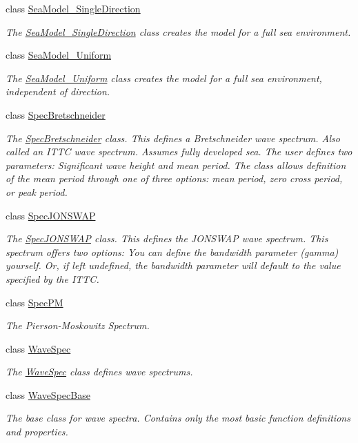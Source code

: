 \begin{DoxyCompactItemize}
class \hyperlink{classosea_1_1_sea_model___single_direction}{Sea\-Model\-\_\-\-Single\-Direction}
\begin{DoxyCompactList}\small\item\em The \hyperlink{classosea_1_1_sea_model___single_direction}{Sea\-Model\-\_\-\-Single\-Direction} class creates the model for a full sea environment. \end{DoxyCompactList}\item 
class \hyperlink{classosea_1_1_sea_model___uniform}{Sea\-Model\-\_\-\-Uniform}
\begin{DoxyCompactList}\small\item\em The \hyperlink{classosea_1_1_sea_model___uniform}{Sea\-Model\-\_\-\-Uniform} class creates the model for a full sea environment, independent of direction. \end{DoxyCompactList}\item 
class \hyperlink{classosea_1_1_spec_bretschneider}{Spec\-Bretschneider}
\begin{DoxyCompactList}\small\item\em The \hyperlink{classosea_1_1_spec_bretschneider}{Spec\-Bretschneider} class. This defines a Bretschneider wave spectrum. Also called an I\-T\-T\-C wave spectrum. Assumes fully developed sea. The user defines two parameters\-: Significant wave height and mean period. The class allows definition of the mean period through one of three options\-: mean period, zero cross period, or peak period. \end{DoxyCompactList}\item 
class \hyperlink{classosea_1_1_spec_j_o_n_s_w_a_p}{Spec\-J\-O\-N\-S\-W\-A\-P}
\begin{DoxyCompactList}\small\item\em The \hyperlink{classosea_1_1_spec_j_o_n_s_w_a_p}{Spec\-J\-O\-N\-S\-W\-A\-P} class. This defines the J\-O\-N\-S\-W\-A\-P wave spectrum. This spectrum offers two options\-: You can define the bandwidth parameter (gamma) yourself. Or, if left undefined, the bandwidth parameter will default to the value specified by the I\-T\-T\-C. \end{DoxyCompactList}\item 
class \hyperlink{classosea_1_1_spec_p_m}{Spec\-P\-M}
\begin{DoxyCompactList}\small\item\em The Pierson-\/\-Moskowitz Spectrum. \end{DoxyCompactList}\item 
class \hyperlink{classosea_1_1_wave_spec}{Wave\-Spec}
\begin{DoxyCompactList}\small\item\em The \hyperlink{classosea_1_1_wave_spec}{Wave\-Spec} class defines wave spectrums. \end{DoxyCompactList}\item 
class \hyperlink{classosea_1_1_wave_spec_base}{Wave\-Spec\-Base}
\begin{DoxyCompactList}\small\item\em The base class for wave spectra. Contains only the most basic function definitions and properties. \end{DoxyCompactList}\end{DoxyCompactItemize}

